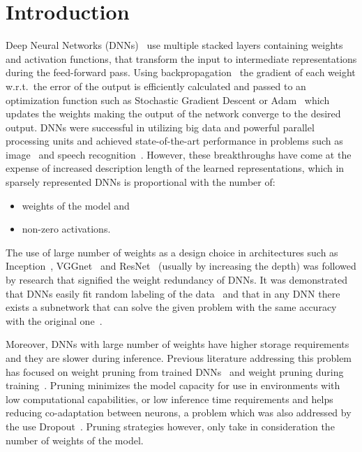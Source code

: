 \documentclass[journal]{IEEEtran}
\begin{document}
\section{Introduction}
Deep Neural Networks (DNNs)~\cite{lecun2015deep} use multiple stacked layers containing weights and activation functions, that transform the input to intermediate representations during the feed-forward pass.
Using backpropagation~\cite{rumelhart1986learning} the gradient of each weight w.r.t.\ the error of the output is efficiently calculated and passed to an optimization function such as Stochastic Gradient Descent or Adam~\cite{kingma2014adam} which updates the weights making the output of the network converge to the desired output.
DNNs were successful in utilizing big data and powerful parallel processing units and achieved state-of-the-art performance in problems such as image~\cite{krizhevsky2012imagenet} and speech recognition~\cite{graves2013speech}.
However, these breakthroughs have come at the expense of increased description length of the learned representations, which in sparsely represented DNNs is proportional with the number of:
\begin{itemize}
	\item weights of the model and
	\item non-zero activations.
\end{itemize}

The use of large number of weights as a design choice in architectures such as Inception~\cite{szegedy2016rethinking}, VGGnet~\cite{simonyan2014very} and ResNet~\cite{he2016deep} (usually by increasing the depth) was followed by research that signified the weight redundancy of DNNs.
It was demonstrated that DNNs easily fit random labeling of the data~\cite{zhang2016understanding} and that in any DNN there exists a subnetwork that can solve the given problem with the same accuracy with the original one~\cite{frankle2018lottery}.

Moreover, DNNs with large number of weights have higher storage requirements and they are slower during inference.
Previous literature addressing this problem has focused on weight pruning from trained DNNs~\cite{aghasi2017net} and weight pruning during training~\cite{lin2017runtime}.
Pruning minimizes the model capacity for use in environments with low computational capabilities, or low inference time requirements and helps reducing co-adaptation between neurons, a problem which was also addressed by the use Dropout~\cite{srivastava2014dropout}.
Pruning strategies however, only take in consideration the number of weights of the model.
\end{document}
